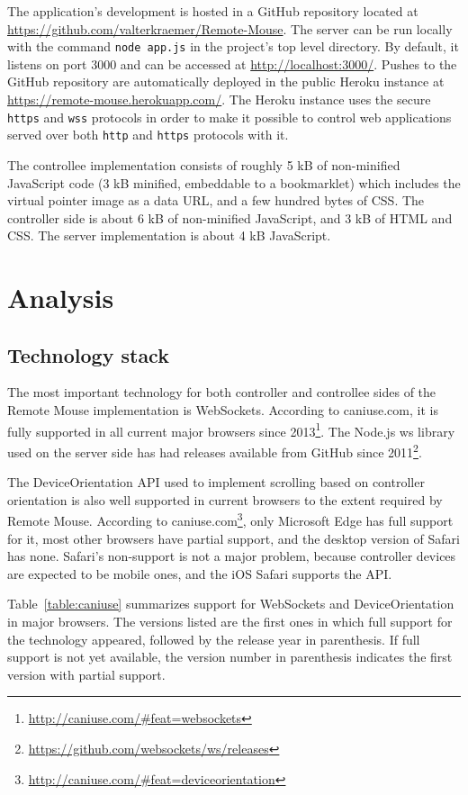 \documentclass[a4paper,english,twocolumn]{article}
\begin{document}
The application's development is hosted in a GitHub repository located
at \url{https://github.com/valterkraemer/Remote-Mouse}. The server can
be run locally with the command \verb!node app.js! in the project's
top level directory. By default, it listens on port 3000 and can be
accessed at \url{http://localhost:3000/}. Pushes to the GitHub
repository are automatically deployed in the public Heroku instance at
\url{https://remote-mouse.herokuapp.com/}. The Heroku instance uses
the secure \verb!https! and \verb!wss! protocols in order to make it
possible to control web applications served over both \verb!http! and
\verb!https! protocols with it.

The controllee implementation consists of roughly 5 kB of non-minified
JavaScript code (3 kB minified, embeddable to a bookmarklet) which
includes the virtual pointer image as a data URL, and a few hundred
bytes of CSS. The controller side is about 6 kB of non-minified
JavaScript, and 3 kB of HTML and CSS. The server implementation is
about 4 kB JavaScript.

\section{Analysis}

\subsection*{Technology stack}

The most important technology for both controller and controllee sides
of the Remote Mouse implementation is WebSockets. According to
caniuse.com, it is fully supported in all current major browsers since
2013\footnote{\url{http://caniuse.com/#feat=websockets}}. The Node.js
ws library used on the server side has had releases available from
GitHub since
2011\footnote{\url{https://github.com/websockets/ws/releases}}.

The DeviceOrientation API used to implement scrolling based on
controller orientation is also well supported in current browsers to
the extent required by Remote Mouse. According to
caniuse.com\footnote{\url{http://caniuse.com/#feat=deviceorientation}},
only Microsoft Edge has full support for it, most other browsers have
partial support, and the desktop version of Safari has none. Safari's
non-support is not a major problem, because controller devices are
expected to be mobile ones, and the iOS Safari supports the API.

Table~\ref{table:caniuse} summarizes support for WebSockets and
DeviceOrientation in major browsers. The versions listed are the first
ones in which full support for the technology appeared, followed by
the release year in parenthesis. If full support is not yet available,
the version number in parenthesis indicates the first version with
partial support.
\end{document}
